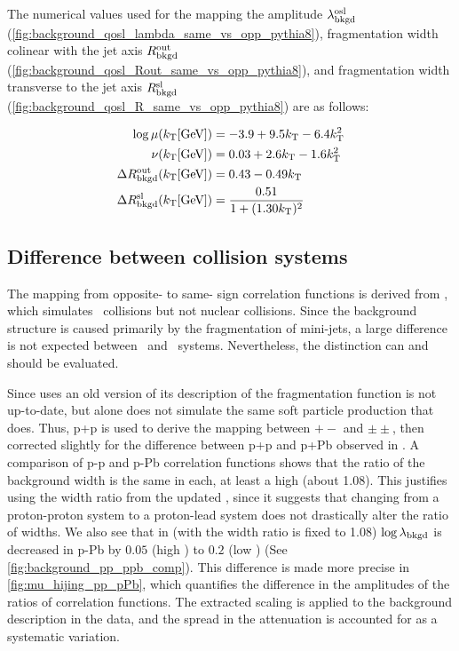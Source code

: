 The numerical values used for the mapping the amplitude $\lambda_{\mathrm{bkgd}}^\mathrm{osl}$ (\cref{fig:background_qosl_lambda_same_vs_opp_pythia8}), fragmentation width colinear with the jet axis $R_{\mathrm{bkgd}}^\mathrm{out}$ (\cref{fig:background_qosl_Rout_same_vs_opp_pythia8}), and fragmentation width transverse to the jet axis $R_{\mathrm{bkgd}}^\mathrm{sl}$ (\cref{fig:background_qosl_R_same_vs_opp_pythia8}) are as follows:

\begin{align}
\log \mu (k_\mathrm{T} [\textrm{GeV}]) &= -3.9 + 9.5 k_\mathrm{T} - 6.4 k_\mathrm{T}^2 \label{eq:mu_osl}\\
\nu(k_\mathrm{T} [\textrm{GeV}]) &= 0.03 + 2.6 k_\mathrm{T} - 1.6 k_\mathrm{T}^2 \label{eq:nu_osl}\\
\Delta R_{\mathrm{bkgd}}^\mathrm{out} (k_\mathrm{T} [\textrm{GeV}]) &= 0.43 - 0.49 k_\mathrm{T} \label{eqn_rbkgdout}\\
\Delta R_{\mathrm{bkgd}}^\mathrm{sl} (k_\mathrm{T} [\textrm{GeV}]) &= \frac{0.51}{1 + (1.30k_\mathrm{T})^2} \label{eqn_rbkgdsl}
\end{align}

\subsection{Difference between collision systems}

The mapping from opposite- to same- sign correlation functions is derived from , which simulates \pp~collisions but not nuclear collisions.
Since the background structure is caused primarily by the fragmentation of mini-jets, a large difference is not expected between \pp~and \pPb~systems.
Nevertheless, the distinction can and should be evaluated.

Since \Hijing uses an old version of  its description of the fragmentation function is not up-to-date, but \Pythia alone does not simulate the same soft particle production that \Hijing does.
Thus, \PYEight p+p is used to derive the mapping between $+-$ and $\pm\pm$, then corrected slightly for the difference between p+p and p+Pb observed in \Hijing.
A comparison of \Hijing p-p and p-Pb correlation functions shows that the ratio of the background width is the same in each, at least a high \kt (about 1.08).
This justifies using the width ratio from the updated \PYEight, since it suggests that changing from a proton-proton system to a proton-lead system does not drastically alter the ratio of widths.
We also see that in \Hijing (with the width ratio is fixed to 1.08) $\log \lambda_{\mathrm{bkgd}}$ is decreased in p-Pb by $0.05$ (high \kt) to $0.2$ (low \kt) (See \cref{fig:background_pp_ppb_comp}). This difference is made more precise in \cref{fig:mu_hijing_pp_pPb}, which quantifies the difference in the amplitudes of the ratios of correlation functions.
The extracted scaling is applied to the background description in the data, and the spread in the attenuation is accounted for as a systematic variation.

